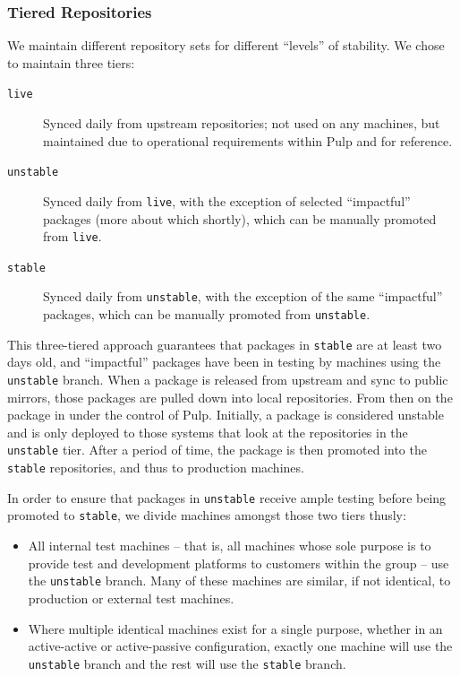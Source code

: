 \subsubsection{Tiered Repositories}

We maintain different repository sets for different ``levels'' of
stability.  We chose to maintain three tiers:

\begin{description}
\item[\texttt{live}] Synced daily from upstream repositories; not used
  on any machines, but maintained due to operational requirements
  within Pulp and for reference.
\item[\texttt{unstable}] Synced daily from \texttt{live}, with the
  exception of selected ``impactful'' packages (more about which
  shortly), which can be manually promoted from \texttt{live}.
\item[\texttt{stable}] Synced daily from \texttt{unstable}, with the
  exception of the same ``impactful'' packages, which can be manually
  promoted from \texttt{unstable}.
\end{description}

This three-tiered approach guarantees that packages in \texttt{stable}
are at least two days old, and ``impactful'' packages have been in
testing by machines using the \texttt{unstable} branch.  When a
package is released from upstream and sync to public mirrors, those
packages are pulled down into local repositories. From then on the
package in under the control of Pulp. Initially, a package is
considered unstable and is only deployed to those systems that look at
the repositories in the \texttt{unstable} tier. After a period of
time, the package is then promoted into the \texttt{stable}
repositories, and thus to production machines.

In order to ensure that packages in \texttt{unstable} receive ample
testing before being promoted to \texttt{stable}, we divide machines
amongst those two tiers thusly:

\begin{itemize}
\item All internal test machines -- that is, all machines whose sole
  purpose is to provide test and development platforms to customers
  within the group -- use the \texttt{unstable} branch.  Many of these
  machines are similar, if not identical, to production or external
  test machines.
\item Where multiple identical machines exist for a single purpose,
  whether in an active-active or active-passive configuration, exactly
  one machine will use the \texttt{unstable} branch and the rest will
  use the \texttt{stable} branch.
\end{itemize}

